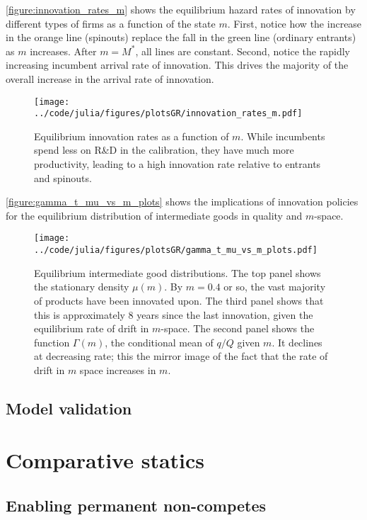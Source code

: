 \documentclass[12pt,english]{article}
\theoremstyle{remark}
\begin{document}
\autoref{figure:innovation_rates_m} shows the equilibrium hazard rates of innovation by different types of firms as a function of the state $m$. First, notice how the increase in the orange line (spinouts) replace the fall in the green line (ordinary entrants) as $m$ increases. After $m = M^*$, all lines are constant. Second, notice the rapidly increasing incumbent arrival rate of innovation. This drives the majority of the overall increase in the arrival rate of innovation.

\begin{figure}
	\texttt{[image: ../code/julia/figures/plotsGR/innovation\_rates\_m.pdf]}
	\caption{Equilibrium innovation rates as a function of $m$. While incumbents spend less on R\&D in the calibration, they have much more productivity, leading to a high innovation rate relative to entrants and spinouts.}
	\label{figure:innovation_rates_m}
\end{figure}

\autoref{figure:gamma_t_mu_vs_m_plots} shows the implications of innovation policies for the equilibrium distribution of intermediate goods in quality and $m$-space.

\begin{figure}
	\texttt{[image: ../code/julia/figures/plotsGR/gamma\_t\_mu\_vs\_m\_plots.pdf]}
	\caption{Equilibrium intermediate good distributions. The top panel shows the stationary density $\mu(m)$. By $m = 0.4$ or so, the vast majority of products have been innovated upon. The third panel shows that this is approximately 8 years since the last innovation, given the equilibrium rate of drift in $m$-space. The second panel shows the function $\Gamma(m)$, the conditional mean of $q / Q$ given $m$. It declines at decreasing rate; this the mirror image of the fact that the rate of drift in $m$ space increases in $m$.}
	\label{figure:gamma_t_mu_vs_m_plots}
\end{figure}



\subsection{Model validation}

\section{Comparative statics}

\subsection{Enabling permanent non-competes}
\end{document}
